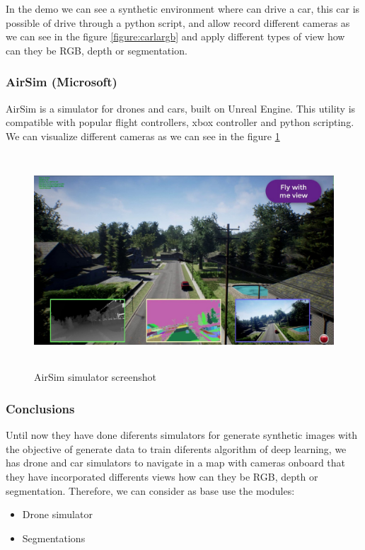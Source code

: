 \documentclass[10pt,a4paper]{article}
\begin{document}
	In the demo we can see a synthetic environment where can drive a car, this car is possible of drive through a python script, and allow record different cameras as we can see in the figure \ref{figure:carlargb} and apply different types of view how can they be RGB, depth or segmentation. 

	
	\newpage
	\subsubsection{AirSim (Microsoft)}	
	AirSim \cite{AirSim} is a simulator for drones and cars, built on Unreal Engine. This utility is compatible with popular flight controllers, xbox controller and python scripting. We can visualize different cameras as we can see in the figure \ref{figure:airsim}  

	\begin{figure}[h!]
		\centering
		\includegraphics[height=8cm]{airsim}
		\caption{AirSim simulator screenshot}
		\label{figure:airsim}
	\end{figure}

	\subsubsection{Conclusions}
	Until now they have done diferents simulators for generate synthetic images with the objective of generate data to train diferents algorithm of deep learning, we has drone and car simulators to navigate in a map with cameras onboard that they have incorporated differents views how can they be RGB, depth or segmentation. Therefore, we can consider as base use the modules:
	\begin{itemize}
	\item Drone simulator
	\item Segmentations
	\end{itemize}
\end{document}
